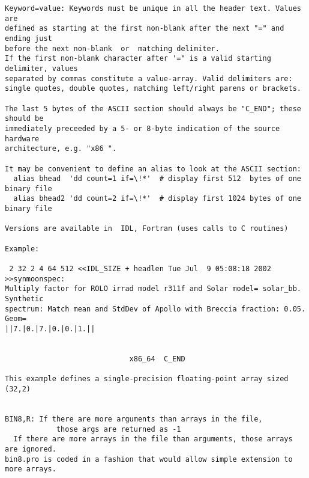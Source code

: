 \begin{verbatim}
Keyword=value: Keywords must be unique in all the header text. Values are 
defined as starting at the first non-blank after the next "=" and ending just 
before the next non-blank  or  matching delimiter.
If the first non-blank character after '=" is a valid starting delimiter, values 
separated by commas constitute a value-array. Valid delimiters are: 
single quotes, double quotes, matching left/right parens or brackets.

The last 5 bytes of the ASCII section should always be "C_END"; these should be
immediately preceeded by a 5- or 8-byte indication of the source hardware
architecture, e.g. "x86 ".

It may be convenient to define an alias to look at the ASCII section:
  alias bhead  'dd count=1 if=\!*'  # display first 512  bytes of one binary file
  alias bhead2 'dd count=2 if=\!*'  # display first 1024 bytes of one binary file

Versions are available in  IDL, Fortran (uses calls to C routines)

Example: 

 2 32 2 4 64 512 <<IDL_SIZE + headlen Tue Jul  9 05:08:18 2002 >>synmoonspec: 
Multiply factor for ROLO irrad model r311f and Solar model= solar_bb. Synthetic 
spectrum: Match mean and StdDev of Apollo with Breccia fraction: 0.05. Geom=
||7.|0.|7.|0.|0.|1.||                                                          
                                                                               
                                                                               
                             x86_64  C_END
 
This example defines a single-precision floating-point array sized (32,2)


BIN8,R: If there are more arguments than arrays in the file, 
            those args are returned as -1
  If there are more arrays in the file than arguments, those arrays are ignored. 
bin8.pro is coded in a fashion that would allow simple extension to more arrays.

\end{verbatim}
